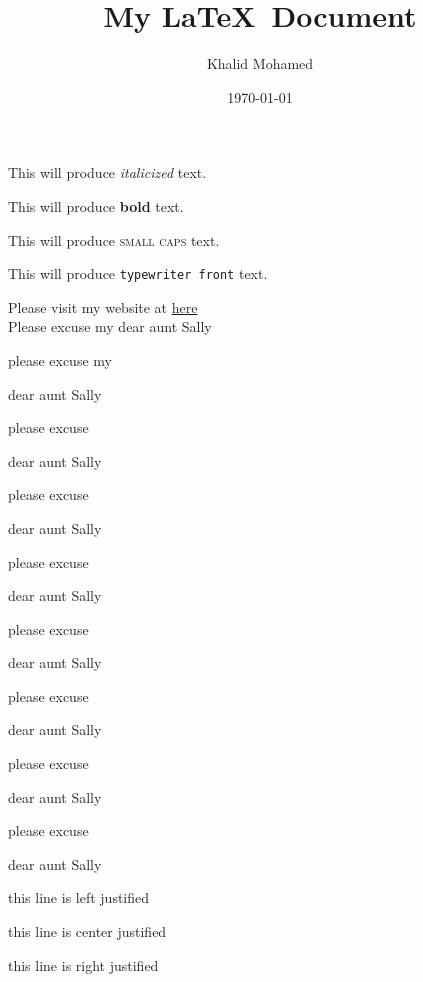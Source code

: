 \documentclass[11pt]{article}
\title{My \LaTeX\ Document}
\author{Khalid Mohamed}
\date{\today}
\begin{document}
\tableofcontents
\maketitle
This will produce \textit{italicized} text.

This will produce \textbf{bold} text.

This will produce \textsc{small caps} text.

This will produce \texttt{typewriter front} text.

Please visit my website at \href{http://www.google.com}{here}\\[.2cm]

Please excuse my dear aunt Sally

please excuse my\begin{large}
dear aunt Sally
\end{large}

please excuse \begin{Large}
dear aunt Sally
\end{Large} 

please excuse \begin{huge}
dear aunt Sally
\end{huge} 

please excuse \begin{Huge}
dear aunt Sally
\end{Huge}

please excuse \begin{normalsize}
dear aunt Sally
\end{normalsize}

please excuse \begin{small}
dear aunt Sally
\end{small}

please excuse \begin{scriptsize}
dear aunt Sally
\end{scriptsize}

 please excuse \begin{tiny}
dear aunt Sally
\end{tiny}

\begin{flushleft}
this line is left justified
\end{flushleft}

\begin{center}
this line is center justified
\end{center}

\begin{flushright}
this line is right justified
\end{flushright}
\end{document}
